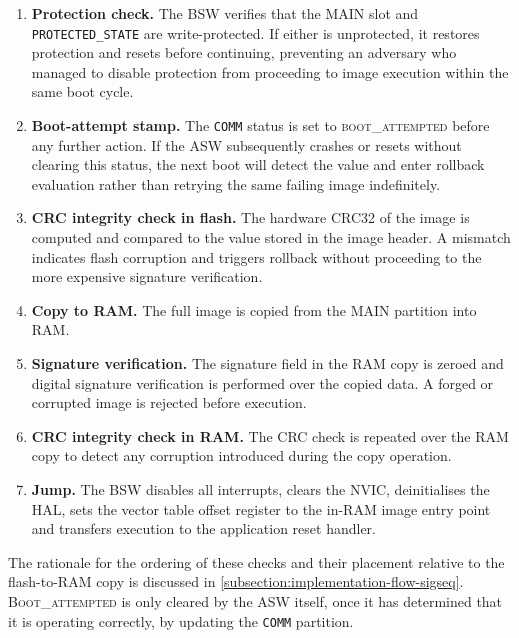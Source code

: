 \begin{enumerate}
    \item \textbf{Protection check.}  The BSW verifies that the MAIN slot and \texttt{PROTECTED\_STATE} are write-protected.  If either is unprotected, it restores protection and resets before continuing, preventing an adversary who managed to disable protection from proceeding to image execution within the same boot cycle.

    \item \textbf{Boot-attempt stamp.}  The \texttt{COMM} status is set to \textsc{boot\_attempted} before any further action.  If the ASW subsequently crashes or resets without clearing this status, the next boot will detect the value and enter rollback evaluation rather than retrying the same failing image indefinitely.

    \item \textbf{CRC integrity check in flash.}  The hardware CRC32 of the image is computed and compared to the value stored in the image header.  A mismatch indicates flash corruption and triggers rollback without proceeding to the more expensive signature verification.

    \item \textbf{Copy to RAM.}  The full image is copied from the MAIN partition into RAM.

    \item \textbf{Signature verification.}  The signature field in the RAM copy is zeroed and digital signature verification is performed over the copied data.  A forged or corrupted image is rejected before execution.

    \item \textbf{CRC integrity check in RAM.}  The CRC check is repeated over the RAM copy to detect any corruption introduced during the copy operation.

    \item \textbf{Jump.}  The BSW disables all interrupts, clears the NVIC, deinitialises the HAL, sets the vector table offset register to the in-RAM image entry point and transfers execution to the application reset handler.
\end{enumerate}

The rationale for the ordering of these checks and their placement relative to the flash-to-RAM copy is discussed in \autoref{subsection:implementation-flow-sigseq}. \textsc{Boot\_attempted} is only cleared by the ASW itself, once it has determined that it is operating correctly, by updating the \texttt{COMM} partition.

